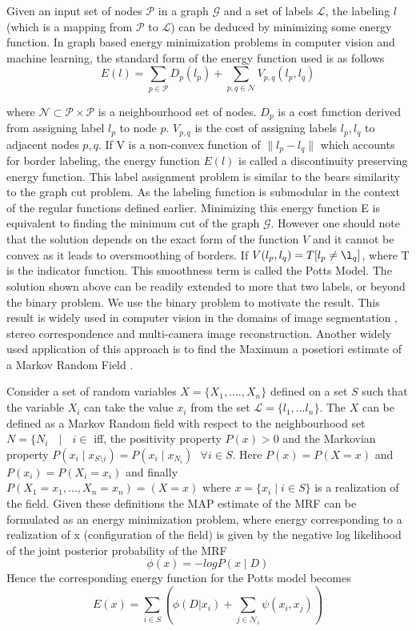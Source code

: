 Given an input set of nodes $\mathcal{P}$ in a graph $\mathcal{G}$ and a set of labels $\mathcal{L}$, the labeling $l$ (which is a mapping from $\mathcal{P}$ to $\mathcal{L}$) can be deduced by minimizing some energy function. In graph based energy minimization problems in computer vision and machine learning, the standard form of the energy function used is as follows
\[
E(l) = \underset{p\in\mathcal{P}}{\operatorname{\sum}} D_p(l_p) + \underset{p,q\in\mathcal{N}}{\operatorname{\sum}} V_{p,q}(l_p,l_q)
\]

where $\mathcal{N} \subset \mathcal{P}\times\mathcal{P}$ is a neighbourhood set of nodes. $D_p$ is a cost function derived from assigning label $l_p$ to node $p$. $V_{p,q}$ is the cost of assigning labels $l_p,l_q$ to adjacent nodes $p,q$. If V is a non-convex function of $\|l_p - l_q\|$ which accounts for border labeling, the energy function $E(l)$ is called a discontinuity preserving energy function. This label assignment problem is similar to the bears similarity to the graph cut problem. As the labeling function is submodular in the context of the regular functions defined earlier. Minimizing this energy function E is equivalent to finding the minimum cut of the graph $\mathcal{G}$. However one should note that the solution depends on the exact form of the function $V$ and it cannot be convex as it leads to oversmoothing of borders. If $V(l_p,l_q)=T[l_p\neq\l_q]$, where T is the indicator function. This smoothness term is called the Potts Model. The solution shown above can be readily extended to more that two labels, or beyond the binary problem. We use the binary problem to motivate the result. This result is widely used in computer vision in the domains of image segmentation , stereo correspondence and multi-camera image reconstruction. Another widely used application of this approach is to find the Maximum a posetiori estimate of a Markov Random Field \cite{MRFKohli}.

Consider a set of random variables $X = \{X_1,....,X_n\}$ defined on a set $S$ such that the variable $X_i$ can take the value $x_i$ from the set $\mathcal{L} = \{l_1,...l_n\}$. The $X$ can be defined as a Markov Random field with respect to the neighbourhood set $N = \{N_i \text{ } \mid \text{ } i\in$ iff, the positivity property $P(x) > 0$ and the Markovian property $P(x_i\mid x_{S\setminus {i}}) = P(x_i \mid x_{N_i}) \text{ } \forall i \in S$. Here $P(x) = P(X = x)$ and $P(x_i) = P(X_i = x_i)$ and finally $P(X_1 = x_1,...,X_n = x_n)  = (X = x) \text{ where } x = \{x_i \mid i\in S\}$ is a realization of the field. Given these definitions the MAP estimate of the MRF can be formulated as an energy minimization problem, where energy corresponding to a realization of x (configuration of the field) is given by the negative log likelihood of the joint posterior probability of the MRF
\[
\phi(x) = -logP(x\mid D)
\]
Hence the corresponding energy function for the Potts model becomes 
\[
E(x) =  \underset{i\in S}{\operatorname{\sum}} \left(\phi(D|x_i) + \underset{j\in \mathcal{N}_i}{\operatorname{\sum}}\psi(x_i,x_j) \right)
\]

